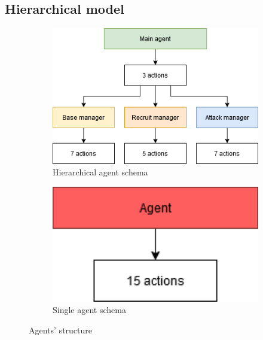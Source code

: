 \subsection{Hierarchical model}

\begin{figure}[t]
    \centering
    \begin{subfigure}[b]{0.45\textwidth}
        \includegraphics[width=1\textwidth]{figs/multi_agent_schema.png}
        \caption{Hierarchical agent schema}
        \label{fig:multi_schema}
    \end{subfigure}
    \hspace{1cm}
    \begin{subfigure}[b]{0.25\textwidth}
        \includegraphics[width=1\textwidth]{figs/single_agent_schema.png}
        \caption{Single agent schema}
        \label{fig:single_schema}
    \end{subfigure}
    \hfill
    \caption{Agents' structure}
\end{figure}

